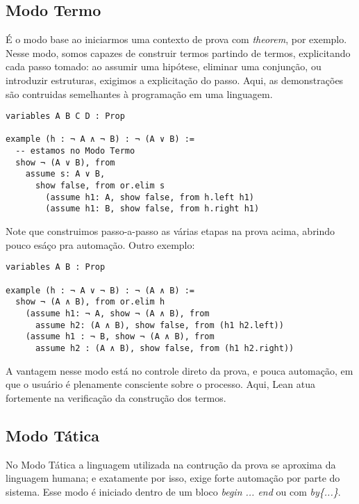 \subsection{Modo Termo}
É o modo base ao iniciarmos uma contexto de prova com \textit{theorem}, por exemplo. Nesse modo, somos capazes de construir termos partindo de termos, explicitando cada passo tomado: ao assumir uma hipótese, eliminar uma conjunção, ou introduzir estruturas, exigimos a explicitação do passo. Aqui, as demonstrações são contruidas semelhantes à programação em uma linguagem.

\vspace{5mm}
\begin{lstlisting}
variables A B C D : Prop

example (h : ¬ A ∧ ¬ B) : ¬ (A ∨ B) :=
  -- estamos no Modo Termo
  show ¬ (A ∨ B), from
    assume s: A ∨ B,
      show false, from or.elim s
        (assume h1: A, show false, from h.left h1)
        (assume h1: B, show false, from h.right h1)
\end{lstlisting}
\vspace{5mm}

\noindent Note que construimos passo-a-passo as várias etapas na prova acima, abrindo pouco esáço pra automação. Outro exemplo:

\vspace{5mm}
\begin{lstlisting}
variables A B : Prop

example (h : ¬ A ∨ ¬ B) : ¬ (A ∧ B) :=
  show ¬ (A ∧ B), from or.elim h
    (assume h1: ¬ A, show ¬ (A ∧ B), from
      assume h2: (A ∧ B), show false, from (h1 h2.left))
    (assume h1 : ¬ B, show ¬ (A ∧ B), from
      assume h2 : (A ∧ B), show false, from (h1 h2.right))
\end{lstlisting}
\vspace{5mm}

\noindent A vantagem nesse modo está no controle direto da prova, e pouca automação, em que o usuário é plenamente consciente sobre o processo. Aqui, Lean atua fortemente na verificação da construção dos termos.

\subsection{Modo Tática}
No Modo Tática a linguagem utilizada na contrução da prova se aproxima da linguagem humana; e exatamente por isso, exige forte automação por parte do sistema. Esse modo é iniciado dentro de um bloco \textit{begin ... end} ou com \textit{by\{...\}}.

